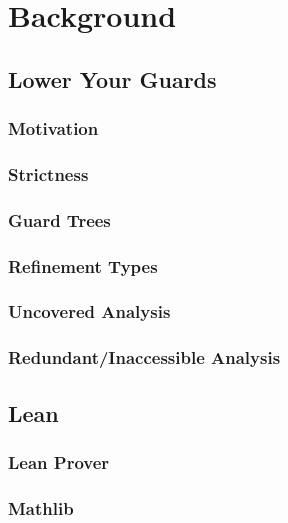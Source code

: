 \chapter{Background}\label{sec:background}

\section{Lower Your Guards}

\subsection{Motivation}

\subsection{Strictness}

\subsection{Guard Trees}

\subsection{Refinement Types}

\subsection{Uncovered Analysis}

\subsection{Redundant/Inaccessible Analysis}

\section{Lean}

\subsection{Lean Prover}

\subsection{Mathlib}
